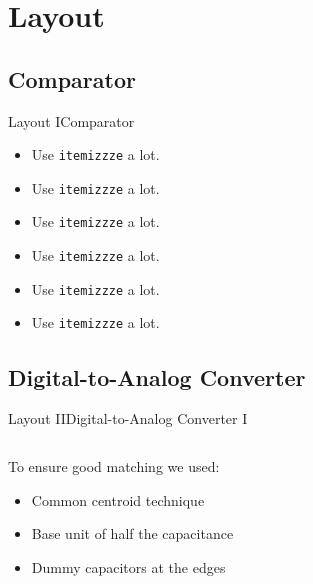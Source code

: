 \documentclass{beamer}
\begin{document}
 \section{Layout}
 \subsection{Comparator}
 \begin{frame}{Layout I}{Comparator}
  \begin{itemize}
   \item Use \texttt{itemizzze} a lot.
   \item Use \texttt{itemizzze} a lot.
   \item Use \texttt{itemizzze} a lot.
   \item Use \texttt{itemizzze} a lot.
   \item Use \texttt{itemizzze} a lot.
   \item Use \texttt{itemizzze} a lot.
  \end{itemize}
 \end{frame}
 
 \subsection{Digital-to-Analog Converter}
 \begin{frame}{Layout II}{Digital-to-Analog Converter I}
    \begin{columns}
    \begin{column}{0.40\linewidth}
    To ensure good matching we used: 
    \begin{itemize}
        \item Common centroid technique
        \item<2-> Base unit of half the capacitance
        \item<3-> Dummy capacitors at the edges
    \end{itemize}
    \vspace{3em}
    \end{column}
    \begin{column}{0.60\linewidth}
        \centering
    \end{column}
    \end{columns}
 \end{frame}
 
\end{document}
